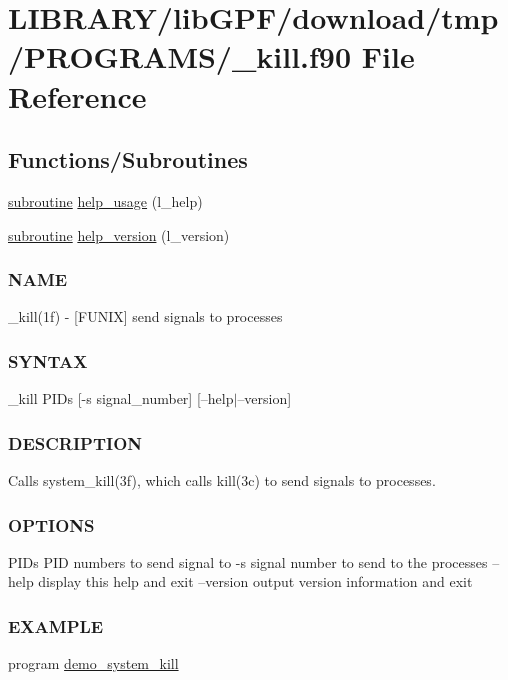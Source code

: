 \hypertarget{__kill_8f90}{}\section{L\+I\+B\+R\+A\+R\+Y/lib\+G\+P\+F/download/tmp/\+P\+R\+O\+G\+R\+A\+M\+S/\+\_\+kill.f90 File Reference}
\label{__kill_8f90}
\subsection*{Functions/\+Subroutines}
\begin{DoxyCompactItemize}
\item 
\hyperlink{M__stopwatch_83_8txt_acfbcff50169d691ff02d4a123ed70482}{subroutine} \hyperlink{__kill_8f90_a3e09a3b52ee8fb04eeb93fe5761626a8}{help\+\_\+usage} (l\+\_\+help)
\item 
\hyperlink{M__stopwatch_83_8txt_acfbcff50169d691ff02d4a123ed70482}{subroutine} \hyperlink{__kill_8f90_a39c21619b08a3c22f19e2306efd7f766}{help\+\_\+version} (l\+\_\+version)
\begin{DoxyCompactList}\small\item\em \subsubsection*{N\+A\+ME}

\+\_\+kill(1f) -\/ \mbox{[}F\+U\+N\+IX\mbox{]} send signals to processes \subsubsection*{S\+Y\+N\+T\+AX}

\+\_\+kill P\+I\+Ds \mbox{[}-\/s signal\+\_\+number\mbox{]} \mbox{[}--help$\vert$--version\mbox{]} \subsubsection*{D\+E\+S\+C\+R\+I\+P\+T\+I\+ON}

Calls system\+\_\+kill(3f), which calls kill(3c) to send signals to processes. \subsubsection*{O\+P\+T\+I\+O\+NS}

P\+I\+Ds P\+ID numbers to send signal to -\/s signal number to send to the processes --help display this help and exit --version output version information and exit \subsubsection*{E\+X\+A\+M\+P\+LE}\end{DoxyCompactList}\item 
program \hyperlink{__kill_8f90_ad2550a0eb8119ef21d3febfe883f2051}{demo\+\_\+system\+\_\+kill}
\end{DoxyCompactItemize}


